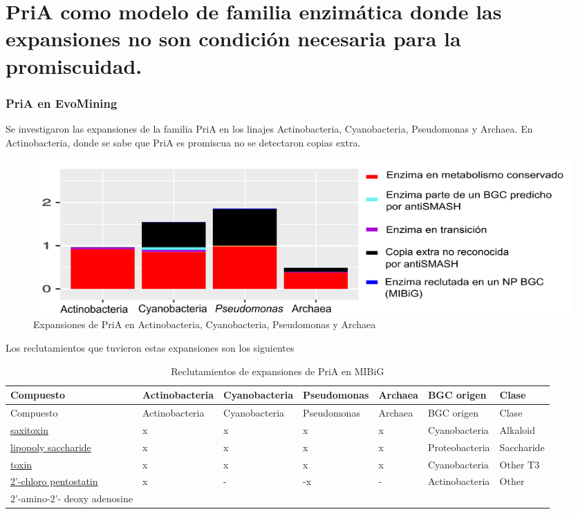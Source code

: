 \documentclass[12pt,twoside]{reedthesis}
\begin{document}
  \section{PriA como modelo de familia enzimática donde las expansiones no
  son condición necesaria para la
  promiscuidad.}\label{pria-como-modelo-de-familia-enzimatica-donde-las-expansiones-no-son-condicion-necesaria-para-la-promiscuidad.}
  
  \subsubsection{PriA en EvoMining}\label{pria-en-evomining}
  
  Se investigaron las expansiones de la familia PriA en los linajes
  Actinobacteria, Cyanobacteria, Pseudomonas y Archaea. En Actinobacteria,
  donde se sabe que PriA es promiscua no se detectaron copias extra.
  
  \begin{figure}[h!tbp]
  \centering
  \includegraphics[angle = 0,scale = 1]{chapter4/PriAExpansiones.png}
  \caption[Expansiones de PriA en Actinobacteria, Cyanobacteria, Pseudomonas y Archaea]{\normalsize{Expansiones de PriA en Actinobacteria, Cyanobacteria, Pseudomonas y Archaea}}
  \label{fig:Expansiones de PriA en Actinobacteria, Cyanobacteria, Pseudomonas y Archaea}
  \end{figure}
  
  Los reclutamientos que tuvieron estas expansiones son los siguientes
  
  \begin{longtable}[]{@{}lllllll@{}}
  \caption{Reclutamientos de expansiones de PriA en MIBiG
  \label{tab:inher}}\tabularnewline
  \toprule
  Compuesto & Actinobacteria & Cyanobacteria & Pseudomonas & Archaea & BGC
  origen & Clase\tabularnewline
  \midrule
  \endfirsthead
  \toprule
  Compuesto & Actinobacteria & Cyanobacteria & Pseudomonas & Archaea & BGC
  origen & Clase\tabularnewline
  \midrule
  \endhead
  \href{http://mibig.secondarymetabolites.org/repository/BGC0000188/index.html\#cluster-1}{saxitoxin}
  & x & x & x & x & Cyanobacteria & Alkaloid\tabularnewline
  \href{http://mibig.secondarymetabolites.org/repository/BGC0000775/index.html\#cluster-1}{lipopoly
  saccharide} & x & x & x & x & Proteobacteria & Saccharide\tabularnewline
  \href{http://mibig.secondarymetabolites.org/repository/BGC0000928/index.html\#cluster-1}{toxin}
  & x & x & x & x & Cyanobacteria & Other T3\tabularnewline
  \href{http://mibig.secondarymetabolites.org/repository/BGC0001484/index.html\#cluster-1}{2'-chloro
  pentostatin} & x & - & -x & - & Actinobacteria & Other\tabularnewline
  2'-amino-2'- deoxy adenosine & & & & & &\tabularnewline
  \bottomrule
  \end{longtable}
  
\end{document}
